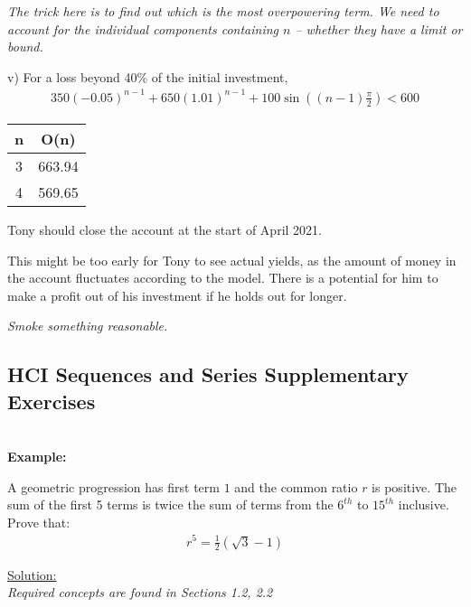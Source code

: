 \documentclass[12pt, a4paper, titlepage]{article}
\begin{document}
\emph{The trick here is to find out which is the most overpowering term. We need to account for the individual components containing $n$ -- whether they have a limit or bound.}

v)
For a loss beyond 40\% of the initial investment,
\begin{align*}
    350(-0.05)^{n - 1} + 650(1.01)^{n - 1} + 100 \sin ((n - 1)\frac{\pi}{2}) < 600
\end{align*}

\begin{minipage}{0.4\textwidth} %
    \begin{tabular}{c|c}
        n & O(n) \\
        \hline
        3 & 663.94 \\
        \hline
        4 & 569.65 \\
    \end{tabular}
\end{minipage}
\begin{minipage}{0.4\textwidth} %
    Tony should close the account at the start of April 2021.
\end{minipage}

This might be too early for Tony to see actual yields, as the amount of money in the account fluctuates according to the model. There is a potential for him to make a profit out of his investment if he holds out for longer.

\emph{Smoke something reasonable.}

\subsection{HCI Sequences and Series Supplementary Exercises}

\textbf{\\ Example:}

A geometric progression has first term $1$ and the common ratio $r$ is positive. The sum of the first 5 terms is twice the sum of terms from the $6^{th}$ to $15^{th}$ inclusive. Prove that:
\begin{align*}
    r^5 = \frac{1}{2}(\sqrt{3} - 1)
\end{align*}

\begin{flushright}
\end{flushright}

\underline{Solution:} \\
\emph{Required concepts are found in Sections 1.2, 2.2}
\end{document}
